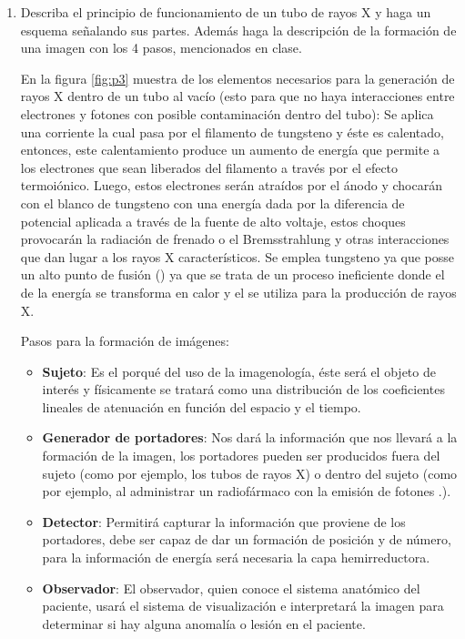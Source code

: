 \begin{enumerate}[1.]
\pagebreak

\item Describa el principio de funcionamiento de un tubo de rayos X y haga un esquema señalando sus partes. Además haga la descripción de la formación de una imagen con los 4 pasos, mencionados en clase.



En la figura \ref{fig:p3} muestra de los elementos necesarios para la generación de rayos X dentro de un tubo al vacío (esto para que no haya interacciones entre electrones y fotones con posible contaminación dentro del tubo): Se aplica una corriente la cual pasa por el filamento de tungsteno y éste es calentado, entonces, este calentamiento produce un aumento de energía que permite a los electrones que sean liberados del filamento a través por el efecto  termoiónico. Luego, estos electrones serán atraídos por el ánodo  y chocarán con el blanco de tungsteno con una energía dada por la diferencia de potencial aplicada a través de la fuente de alto voltaje, estos choques provocarán la radiación de frenado o el Bremsstrahlung y otras interacciones que dan lugar a los rayos X característicos.  Se emplea tungsteno ya que posse un alto punto de fusión  () ya que se trata de un proceso ineficiente donde el  de la energía se transforma en calor y  el  se utiliza para la producción de rayos X.



Pasos para la formación de imágenes:
\begin{itemize}
  \item \textbf{Sujeto}: Es el porqué del uso de la imagenología, éste será el objeto de interés y físicamente se tratará como una distribución de los coeficientes lineales de atenuación en función del espacio y el tiempo.
  \item \textbf{Generador de portadores}: Nos dará la información que nos llevará a la formación de la imagen, los portadores pueden ser producidos fuera del sujeto (como por ejemplo, los tubos de rayos X) o dentro del sujeto (como por ejemplo, al administrar un radiofármaco con la emisión de fotones \ec{\gamma}.).
  \item \textbf{Detector}: Permitirá capturar la información que proviene de los portadores, debe ser capaz de dar un formación de posición y de número, para la información de energía será necesaria la capa hemirreductora.
  \item \textbf{Observador}: El observador, quien conoce el sistema anatómico del paciente, usará el sistema de visualización  e interpretará la imagen para determinar si hay alguna anomalía o lesión en el paciente.
\end{itemize}







\end{enumerate}
